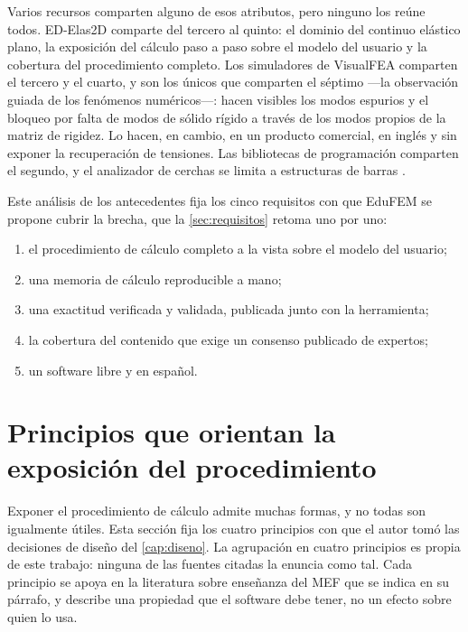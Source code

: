 Varios recursos comparten alguno de esos atributos, pero ninguno los reúne todos. ED-Elas2D comparte del tercero al quinto: el dominio del continuo elástico plano, la exposición del cálculo paso a paso sobre el modelo del usuario y la cobertura del procedimiento completo. Los simuladores de VisualFEA comparten el tercero y el cuarto, y son los únicos que comparten el séptimo ---la observación guiada de los fenómenos numéricos---: hacen visibles los modos espurios y el bloqueo por falta de modos de sólido rígido a través de los modos propios de la matriz de rigidez. Lo hacen, en cambio, en un producto comercial, en inglés y sin exponer la recuperación de tensiones. Las bibliotecas de programación comparten el segundo, y el analizador de cerchas se limita a estructuras de barras \autocite[p.~1023]{bishay2020teaching}.

Este análisis de los antecedentes fija los cinco requisitos con que EduFEM se propone cubrir la brecha, que la \autoref{sec:requisitos} retoma uno por uno:

\begin{enumerate}
    \item el procedimiento de cálculo completo a la vista sobre el modelo del usuario;
    \item una memoria de cálculo reproducible a mano;
    \item una exactitud verificada y validada, publicada junto con la herramienta;
    \item la cobertura del contenido que exige un consenso publicado de expertos;
    \item un software libre y en español.
\end{enumerate}

\section{Principios que orientan la exposición del procedimiento}
\label{sec:fundamentos-pedagogicos}

Exponer el procedimiento de cálculo admite muchas formas, y no todas son igualmente útiles. Esta sección fija los cuatro principios con que el autor tomó las decisiones de diseño del \autoref{cap:diseno}. La agrupación en cuatro principios es propia de este trabajo: ninguna de las fuentes citadas la enuncia como tal. Cada principio se apoya en la literatura sobre enseñanza del MEF que se indica en su párrafo, y describe una propiedad que el software debe tener, no un efecto sobre quien lo usa.

